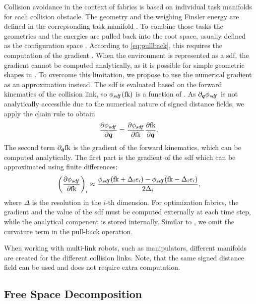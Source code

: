 Collision avoidance in the context of \ac{fabrics} is based on
individual task manifolds for each collision obstacle. The geometry and the 
weighing Finsler energy are defined in the correpsonding task manifold \X{}.
To combine those tasks the geometries and the energies are pulled back into the
root space, usually defined as the configuration space \Q{}. According 
to \cref{eq:pullback}, this requires the computation of the gradient \J{}.
When the environment is represented as a \ac{sdf}, the gradient cannot be
computed analytically, as it is possible for simple geometric shapes in
\cite{Ratliff2021,Spahn2023}. To overcome this limitation, we propose to
use the numerical gradient as an approximation instead.
The \ac{sdf} is evaluated based on the forward kinematics of the collision link,
so $\phi_{sdf}(\textrm{fk})$ is a function of \q{}.
As $\partial_{\bm{q}}\phi_{sdf}$ is not analytically accessible due to the numerical
nature of signed distance fields, we apply the chain rule to obtain
\[
  \frac{\partial\phi_{sdf}}{\partial\bm{q}} = \frac{\partial\phi_{sdf}}{\partial\textrm{fk}}\frac{\partial\textrm{fk}}{\partial\bm{q}}.
\]
The second term $\partial_{\bm{q}}\textrm{fk}$ is the gradient of the forward
kinematics, which can be computed analytically. The first part is the gradient
of the \ac{sdf} which can be
approximated using finite differences:
\[
  \left(\frac{\partial\phi_{sdf}}{\partial\textrm{fk}}\right)_i \approx 
  \frac{\phi_{sdf}(\textrm{fk} + \Delta_i e_i) - \phi_{sdf}(\textrm{fk} - \Delta_i e_i)}{2 \Delta_i},
\]
where $\Delta$ is the resolution in the $i$-th dimension. For optimization
\ac{fabrics}, the gradient and the value of the \ac{sdf} must be computed externally
at each time step, while the analytical compenent is stored internally. Similar
to \cite{Ratliff2021}, we omit the curvature term \Jdot{} in the pull-back
operation.

When working with multi-link robots, such as manipulators, different manifolds
are created for the different collision links. Note, that the same signed
distance field can be used and does not require extra computation.

\subsection{Free Space Decomposition}
\label{sub:Free Space Decomposition}

